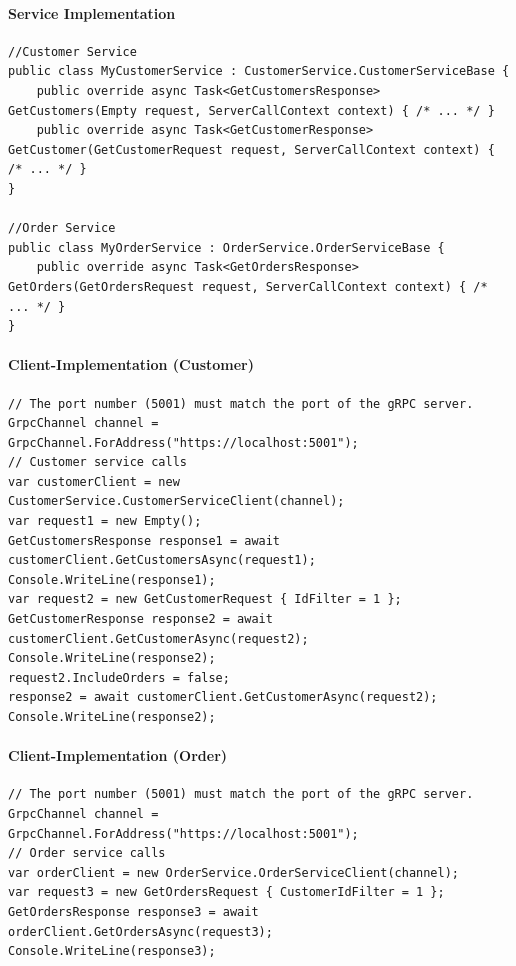 \documentclass[
a4paper,
oneside,
10pt,
fleqn,
headsepline,
toc=listofnumbered, 
bibliography=totocnumbered]{scrartcl}
\begin{document}
\paragraph{Service Implementation}
\begin{lstlisting}
//Customer Service
public class MyCustomerService : CustomerService.CustomerServiceBase {
    public override async Task<GetCustomersResponse> GetCustomers(Empty request, ServerCallContext context) { /* ... */ }
    public override async Task<GetCustomerResponse> GetCustomer(GetCustomerRequest request, ServerCallContext context) { /* ... */ }
}

//Order Service
public class MyOrderService : OrderService.OrderServiceBase {
    public override async Task<GetOrdersResponse> GetOrders(GetOrdersRequest request, ServerCallContext context) { /* ... */ }
}
\end{lstlisting}

\paragraph{Client-Implementation (Customer)}
\begin{lstlisting}
// The port number (5001) must match the port of the gRPC server.
GrpcChannel channel = GrpcChannel.ForAddress("https://localhost:5001");
// Customer service calls
var customerClient = new CustomerService.CustomerServiceClient(channel);
var request1 = new Empty();
GetCustomersResponse response1 = await customerClient.GetCustomersAsync(request1);
Console.WriteLine(response1);
var request2 = new GetCustomerRequest { IdFilter = 1 };
GetCustomerResponse response2 = await customerClient.GetCustomerAsync(request2);
Console.WriteLine(response2);
request2.IncludeOrders = false;
response2 = await customerClient.GetCustomerAsync(request2);
Console.WriteLine(response2);
\end{lstlisting}

\paragraph{Client-Implementation (Order)}
\begin{lstlisting}
// The port number (5001) must match the port of the gRPC server.
GrpcChannel channel = GrpcChannel.ForAddress("https://localhost:5001");
// Order service calls
var orderClient = new OrderService.OrderServiceClient(channel);
var request3 = new GetOrdersRequest { CustomerIdFilter = 1 };
GetOrdersResponse response3 = await orderClient.GetOrdersAsync(request3);
Console.WriteLine(response3);
\end{lstlisting}
\end{document}
